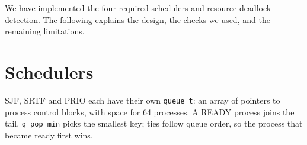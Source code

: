 \documentclass[11pt,a4paper,twocolumn]{article}
\newcommand{\code}[1]{\texttt{#1}}
\begin{document}

We have implemented the four required schedulers and resource deadlock
detection. The following explains the design, the checks we used, and
the remaining limitations.

\section{Schedulers}

SJF, SRTF and PRIO each have their own \code{queue\_t}: an array of
pointers to process control blocks, with space for 64 processes. A READY
process joins the tail. \code{q\_pop\_min} picks the smallest key; ties
follow queue order, so the process that became ready first wins.
\end{document}
